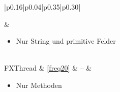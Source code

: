 \begin{table}[H]
\begin{tabular}{|p{0.16\textwidth}|p{0.04\textwidth}|p{0.35\textwidth}|p{0.30\textwidth}|}
\begin{minipage}[t]{\linewidth}
		\end{minipage} & 
		\begin{minipage}[t]{\linewidth}
			\begin{itemize}[nosep,after=\strut,leftmargin=*]
				\item Nur String und primitive Felder
			\end{itemize}
		\end{minipage} \\
		\hline
		FXThread & \ref{freq20} & -- & 
		\begin{minipage}[t]{\linewidth}
			\begin{itemize}[nosep,after=\strut,leftmargin=*]
				\item Nur Methoden
			\end{itemize}
		\end{minipage} \\
		\hline
	\end{tabular}
\end{table}